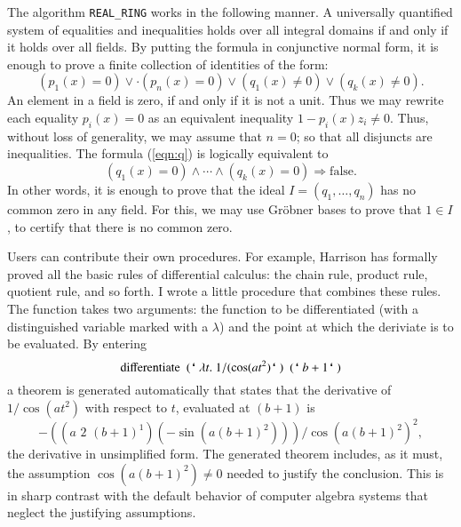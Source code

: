 \documentclass{llncs}
\def\bq{\text{\tt {`}\,}}
\begin{document}
The algorithm {\tt REAL\_RING} works in the following manner.  A universally
quantified system of equalities and inequalities holds over all integral
domains if and only if it holds over all fields.  
By putting the formula
in conjunctive normal form, it is enough to prove a finite collection of
identities of the form:
\begin{equation}\label{eqn:q}
(p_1(x)=0) \lor \cdot (p_n(x)=0) \lor (q_1(x)\ne 0) \lor (q_k(x)\ne 0).
\end{equation}
An element in a field is zero, if and only if it is not a unit.  Thus we may
rewrite each equality $p_i(x)=0$ as an equivalent inequality $1-p_i(x)z_i\ne 0$.
Thus, without loss of generality, we may assume that $n=0$; so that all disjuncts
are inequalities.  The formula (\ref{eqn:q}) is logically equivalent to
\[
(q_1(x) =0) \land \cdots \land (q_k(x) = 0) \Longrightarrow \text{false}.
\]
In other words, it is enough to prove that 
the ideal $I=(q_1,\ldots,q_n)$ has no common zero in any field.  For this,
we may use Gr\"obner bases  to prove that $1\in I$, to certify that
there is no common zero.  




Users can contribute their own procedures.  For example, Harrison has
formally proved all the basic rules of differential calculus: the
chain rule, product rule, quotient rule, and so forth.  I wrote a
little procedure that combines these rules. The function 
takes two arguments: the function to be differentiated (with a distinguished variable
marked with a $\lambda$) and  the point at which the deriviate is to be evaluated.
By 
entering
\[
\text{differentiate}~~  (\bq\lambda t.\ 1/(\cos(a  t^2)\bq)
~~(\bq b+1\bq)
\]
a theorem is generated automatically that states that the derivative of $1/\cos(at^2)$ 
with respect to $t$, evaluated at $(b+1)$ is
\[
  -((a\,\,  2\,\,  (b + 1) ^1) ( -\sin (a  (b + 1)^2))) /
      \cos (a  (b + 1) ^2 ) ^2,
\]
the derivative in unsimplified form.
The generated theorem includes, as it must, the
assumption $\cos(a (b+1)^2)\ne 0$ needed to justify the conclusion.  This
is in sharp contrast with the default behavior of computer algebra
systems that neglect the justifying assumptions.  
\end{document}
